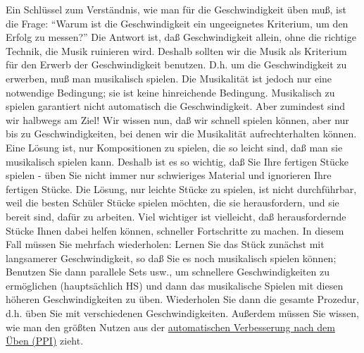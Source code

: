Ein Schlüssel zum Verständnis, wie man für die Geschwindigkeit üben muß, ist die Frage: \enquote{Warum ist die Geschwindigkeit ein ungeeignetes Kriterium, um den Erfolg zu messen?}
Die Antwort ist, daß Geschwindigkeit allein, ohne die richtige Technik, die Musik ruinieren wird.
Deshalb sollten wir die Musik als Kriterium für den Erwerb der Geschwindigkeit benutzen.
D.h. um die Geschwindigkeit zu erwerben, muß man musikalisch spielen.
Die Musikalität ist jedoch nur eine notwendige Bedingung; sie ist keine hinreichende Bedingung.
Musikalisch zu spielen garantiert nicht automatisch die Geschwindigkeit.
Aber zumindest sind wir halbwegs am Ziel!
Wir wissen nun, daß wir schnell spielen können, aber nur bis zu Geschwindigkeiten, bei denen wir die Musikalität aufrechterhalten können.
Eine Lösung ist, nur Kompositionen zu spielen, die so leicht sind, daß man sie musikalisch spielen kann.
Deshalb ist es so wichtig, daß Sie Ihre fertigen Stücke spielen - üben Sie nicht immer nur schwieriges Material und ignorieren Ihre fertigen Stücke.
Die Lösung, nur leichte Stücke zu spielen, ist nicht durchführbar, weil die besten Schüler Stücke spielen möchten, die sie herausfordern, und sie bereit sind, dafür zu arbeiten. 
Viel wichtiger ist vielleicht, daß herausfordernde Stücke Ihnen dabei helfen können, schneller Fortschritte zu machen.
In diesem Fall müssen Sie mehrfach wiederholen: Lernen Sie das Stück zunächst mit langsamerer Geschwindigkeit, so daß Sie es noch musikalisch spielen können; Benutzen Sie dann parallele Sets usw., um schnellere Geschwindigkeiten zu ermöglichen (hauptsächlich HS) und dann das musikalische Spielen mit diesen höheren Geschwindigkeiten zu üben.
Wiederholen Sie dann die gesamte Prozedur, d.h. üben Sie mit verschiedenen Geschwindigkeiten.
Außerdem müssen Sie wissen, wie man den größten Nutzen aus der \hyperref[c1ii15]{automatischen Verbesserung nach dem Üben (PPI)} zieht.

